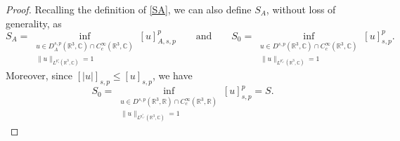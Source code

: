 \documentclass[leqno,11pt]{amsart}
\newcommand{\R}{\mathbb R}
\newcommand{\CC}{\mathbb C}
\newcommand{\C}{\mathbb C}
\numberwithin{equation}{section}
\begin{document}
\begin{proof}
Recalling the definition of \eqref{SA}, we can also define $S_A$, without loss of generality, as 
\begin{equation}\label{SSA}
S_A= \inf_{\substack{u\in D^{s,p}_A(\R^3,\CC)\cap C^\infty_c(\R^3,\C)\\{\|u\|_{L^{p^*_s}(\R^3,\CC)}=1}}} [u]_{A,s,p}^p\qquad \text{and}\qquad S_0= \inf_{\substack{u\in D^{s,p}(\R^3,\CC)\cap C^\infty_c(\R^3,\C)\\{\|u\|_{L^{p^*_s,}(\R^3,\CC)}=1}}} [u]_{s,p}^p . 
\end{equation}
Moreover, since $[|u|]_{s,p}\le [u]_{s,p}$, we have
\begin{equation}\label{SSA:normalized}
S_0= \inf_{\substack{u\in D^{s,p}(\R^3,\R)\cap C^\infty_c(\R^3,\R)\\{\|u\|_{L^{p^*_s,}(\R^3,\CC)}=1}}} [u]_{s,p}^p =S.
\end{equation}



\end{proof}
\end{document}
